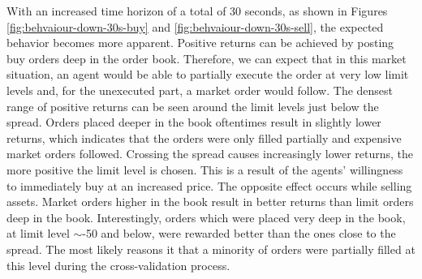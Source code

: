 With an increased time horizon of a total of 30 seconds, as shown in Figures \ref{fig:behvaiour-down-30s-buy} and \ref{fig:behvaiour-down-30s-sell}, the expected behavior becomes more apparent.
Positive returns can be achieved by posting buy orders deep in the order book.
Therefore, we can expect that in this market situation, an agent would be able to partially execute the order at very low limit levels and, for the unexecuted part, a market order would follow.
The densest range of positive returns can be seen around the limit levels just below the spread.
Orders placed deeper in the book oftentimes result in slightly lower returns, which indicates that the orders were only filled partially and expensive market orders followed.
Crossing the spread causes increasingly lower returns, the more positive the limit level is chosen.
This is a result of the agents' willingness to immediately buy at an increased price.
The opposite effect occurs while selling assets.
Market orders higher in the book result in better returns than limit orders deep in the book.
Interestingly, orders which were placed very deep in the book, at limit level $\sim$-50 and below, were rewarded better than the ones close to the spread.
The most likely reasons it that a minority of orders  were partially filled at this level during the cross-validation process.

